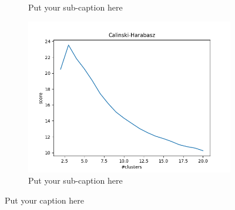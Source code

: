 \documentclass{article}
\begin{document}
\begin{figure}[ht]
\begin{subfigure}{.33\textwidth}
  \caption{Put your sub-caption here}
  \label{fig:sub-second}
\end{subfigure}
\begin{subfigure}{.33\textwidth}
  \centering
  \includegraphics[width=1\linewidth]{1d/Cats/Calinski cats.png}  
  \caption{Put your sub-caption here}
  \label{fig:sub-second}
\end{subfigure}
\caption{Put your caption here}
\label{Int indiciees}
\end{figure}
\end{document}
